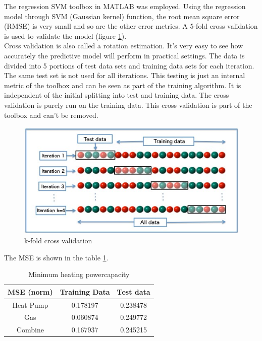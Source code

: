 The regression SVM toolbox in MATLAB was employed. Using the regression model through SVM  (Gaussian kernel) function, the root mean square error (RMSE) is very small and so are the other error metrics.  A 5-fold cross validation is used to validate the model (figure \ref{fig:k-fold cross validation}).\\
Cross validation is also called a rotation estimation. It’s very easy to see how accurately the predictive model will perform in practical settings. The data is divided into 5 portions of test data sets and training data sets for each iteration. The same test set is not used for all iterations. This testing is just an internal metric of the toolbox and can be seen as part of the training algorithm. It is independent of the initial splitting into test and training data. The cross validation is purely run on the training data. This cross validation is part of the toolbox and can’t be removed.


\begin{figure}[H]
	\centering
	\includegraphics[width=1.0\columnwidth]{Pictures/k-fold cross validation.jpg}
	\caption[Short title]{k-fold cross validation}
	\label{fig:k-fold cross validation}
	\end{figure}
	
The MSE is shown in the table \ref{tab:Minimumheatpower}.

\begin{table}[H]
    \centering
    \begin{tabular}{|c|c|c|}
    \hline
    MSE (norm) & Training Data & Test data \\
    
    \hline
     Heat Pump     &  0.178197 & 0.238478\\
     
     \hline
     Gas           &  0.060874 & 	0.249772\\
     
     \hline
     Combine       &  0.167937   & 0.245215\\
    \hline


    \end{tabular}
    \caption{Minimum heating powercapacity}
    \label{tab:Minimumheatpower}
\end{table}

